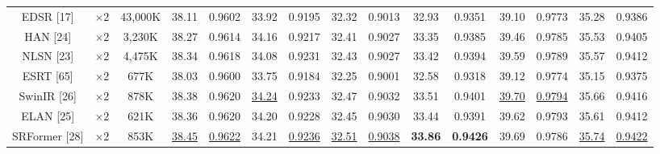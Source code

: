 \documentclass[twocolumn]{svjour3}          %
\begin{document}
\begin{table}
\begin{tabular}{|c|c|c|cc|cc|cc|cc|cc|cc|}

EDSR [17] & $\times 2$&43,000K& \multicolumn{1}{c|}{38.11} & 0.9602 & \multicolumn{1}{c|}{33.92} & 0.9195  &\multicolumn{1}{c|}{32.32} & 0.9013 & \multicolumn{1}{c|}{32.93} & 0.9351  & \multicolumn{1}{c|}{39.10} & 0.9773
&\multicolumn{1}{c|}{35.28} &0.9386\\

HAN [24] & $\times 2$&3,230K& \multicolumn{1}{c|}{38.27} & 0.9614  & \multicolumn{1}{c|}{34.16} & 0.9217  &\multicolumn{1}{c|}{32.41} & 0.9027 & \multicolumn{1}{c|}{33.35} &0.9385& \multicolumn{1}{c|}{39.46} & 0.9785
&\multicolumn{1}{c|}{35.53} &0.9405\\

NLSN [23] & $\times 2$ &4,475K& \multicolumn{1}{c|}{38.34} & 0.9618 & \multicolumn{1}{c|}{34.08} & 0.9231 & \multicolumn{1}{c|}{32.43} & 0.9027 & \multicolumn{1}{c|}{33.42} &0.9394 & \multicolumn{1}{c|}{39.59} & 0.9789
&\multicolumn{1}{c|}{35.57} & 0.9412\\

ESRT [65] & $\times 2$ &677K& \multicolumn{1}{c|}{38.03} & 0.9600 & \multicolumn{1}{c|}{33.75} & 0.9184 & \multicolumn{1}{c|}{32.25} & 0.9001 & \multicolumn{1}{c|}{32.58} &0.9318 & \multicolumn{1}{c|}{39.12} & 0.9774
&\multicolumn{1}{c|}{35.15} & 0.9375\\

SwinIR [26] & $\times 2$ &878K& \multicolumn{1}{c|}{38.38} & {0.9620} & \multicolumn{1}{c|}{\color{blue}\underline{34.24}} &{ 0.9233} & \multicolumn{1}{c|}{32.47} & {0.9032} & \multicolumn{1}{c|}{33.51} & {0.9401} & \multicolumn{1}{c|}{\color{blue}\underline{39.70}} &{\color{blue}\underline{0.9794}} &\multicolumn{1}{c|}{35.66} & { 0.9416}\\

ELAN [25] & $\times 2$ &621K& \multicolumn{1}{c|}{38.36} & 0.9620 & \multicolumn{1}{c|}{34.20} & 0.9228 & \multicolumn{1}{c|}{32.45} & 0.9030 & \multicolumn{1}{c|}{33.44} &0.9391 & \multicolumn{1}{c|}{39.62} & 0.9793
&\multicolumn{1}{c|}{35.61} & 0.9412\\

SRFormer [28] & $\times 2$ &853K& \multicolumn{1}{c|}{\color{blue}\underline{38.45}} & {\color{blue}\underline{0.9622}} & \multicolumn{1}{c|}{34.21} &{\color{blue}\underline{ 0.9236}} & \multicolumn{1}{c|}{\color{blue}\underline{32.51}} & {\color{blue}\underline{0.9038}} & \multicolumn{1}{c|}{\color{red}\textbf{33.86}} & {\color{red}\textbf{0.9426}} & \multicolumn{1}{c|}{39.69} &{0.9786} &\multicolumn{1}{c|}{\color{blue}\underline{35.74}} & {\color{blue}\underline{ 0.9422}}\\


\end{tabular}
\end{table}
\end{document}
